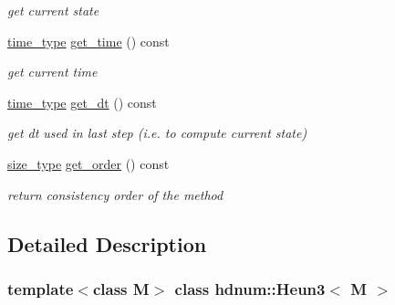 \begin{DoxyCompactItemize}
\begin{DoxyCompactList}\small\item\em get current state \item\end{DoxyCompactList}\item 
\hypertarget{classhdnum_1_1Heun3_ad5438e8365dba3b2cc885a4d22fe0789}{
\hyperlink{classhdnum_1_1Heun3_a48fcfee8624c3e7984dc054d641ff962}{time\_\-type} \hyperlink{classhdnum_1_1Heun3_ad5438e8365dba3b2cc885a4d22fe0789}{get\_\-time} () const }
\label{classhdnum_1_1Heun3_ad5438e8365dba3b2cc885a4d22fe0789}

\begin{DoxyCompactList}\small\item\em get current time \item\end{DoxyCompactList}\item 
\hypertarget{classhdnum_1_1Heun3_a55e46de6d92d67c40ee2aa84cbc4a8d7}{
\hyperlink{classhdnum_1_1Heun3_a48fcfee8624c3e7984dc054d641ff962}{time\_\-type} \hyperlink{classhdnum_1_1Heun3_a55e46de6d92d67c40ee2aa84cbc4a8d7}{get\_\-dt} () const }
\label{classhdnum_1_1Heun3_a55e46de6d92d67c40ee2aa84cbc4a8d7}

\begin{DoxyCompactList}\small\item\em get dt used in last step (i.e. to compute current state) \item\end{DoxyCompactList}\item 
\hypertarget{classhdnum_1_1Heun3_ab6db7ad9e5a6db68e23782dd83200d86}{
\hyperlink{classhdnum_1_1Heun3_a99b9c3470be12f9c3e5e3804e77ec316}{size\_\-type} \hyperlink{classhdnum_1_1Heun3_ab6db7ad9e5a6db68e23782dd83200d86}{get\_\-order} () const }
\label{classhdnum_1_1Heun3_ab6db7ad9e5a6db68e23782dd83200d86}

\begin{DoxyCompactList}\small\item\em return consistency order of the method \item\end{DoxyCompactList}\end{DoxyCompactItemize}


\subsection{Detailed Description}
\subsubsection*{template$<$class M$>$ class hdnum::Heun3$<$ M $>$}

